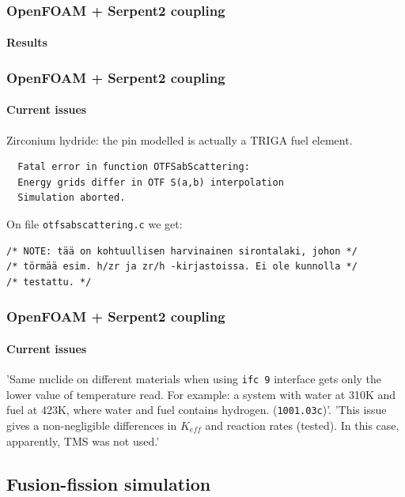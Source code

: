 \documentclass[svgnames,smaller,table]{beamer}
\begin{document}
\begin{frame}
  \frametitle{OpenFOAM + Serpent2 coupling}
  \framesubtitle{Results}
  \begin{center}
    
  \end{center}
\end{frame}

\begin{frame}[fragile] %
  \frametitle{OpenFOAM + Serpent2 coupling}
  \framesubtitle{Current issues}
  \begin{center}
  Zirconium hydride: the pin modelled is actually a TRIGA fuel element.\\
\begin{verbatim}
  Fatal error in function OTFSabScattering:
  Energy grids differ in OTF S(a,b) interpolation
  Simulation aborted.
\end{verbatim}

On file \texttt{otfsabscattering.c} we get:

\begin{verbatim}
/* NOTE: tää on kohtuullisen harvinainen sirontalaki, johon */
/* törmää esim. h/zr ja zr/h -kirjastoissa. Ei ole kunnolla */
/* testattu. */
\end{verbatim}
  
  \end{center}
\end{frame}

\begin{frame}[fragile] %
  \frametitle{OpenFOAM + Serpent2 coupling}
  \framesubtitle{Current issues}  
  'Same nuclide on different materials when using \texttt{ifc 9} interface gets only the lower value
  of temperature read. For example: a system with water at 310K and fuel at 423K, where water and fuel
  contains hydrogen. (\texttt{1001.03c})'.
  \vspace{10px}
  'This issue gives a non-negligible differences in $K_{eff}$ and reaction rates (tested). In this case,
  apparently, TMS was not used.'
\end{frame}



\subsection{Fusion-fission simulation}
\end{document}
